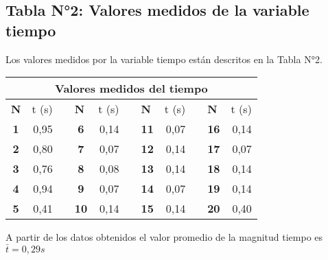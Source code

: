 \documentclass[runningheads]{llncs}
\begin{document}
    \subsection*{Tabla N°2: Valores medidos de la variable tiempo}
    Los valores medidos por la variable tiempo están descritos en la Tabla N°2.\\
    \begin{table}[]
        \centering
        \begin{tabular}{crlcrlcrlcr}
            \hline
            \multicolumn{11}{c}{\textbf{Valores medidos del tiempo}} \\ \hline
            \multicolumn{1}{l}{\textbf{N}} & \multicolumn{1}{l}{t (s)} &  & \multicolumn{1}{l}{\textbf{N}} & \multicolumn{1}{l}{t (s)} &  & \multicolumn{1}{l}{\textbf{N}} & \multicolumn{1}{l}{t (s)} &  & \multicolumn{1}{l}{\textbf{N}} & \multicolumn{1}{l}{t (s)} \\ \hline
            \textbf{1} & 0,95 &  & \textbf{6} & 0,14 &  & \textbf{11} & 0,07 &  & \textbf{16} & 0,14 \\
            \textbf{2} & 0,80 &  & \textbf{7} & 0,07 &  & \textbf{12} & 0,14 &  & \textbf{17} & 0,07 \\
            \textbf{3} & 0,76 &  & \textbf{8} & 0,08 &  & \textbf{13} & 0,14 &  & \textbf{18} & 0,14 \\
            \textbf{4} & 0,94 &  & \textbf{9} & 0,07 &  & \textbf{14} & 0,07 &  & \textbf{19} & 0,14 \\
            \textbf{5} & 0,41 &  & \textbf{10} & 0,14 &  & \textbf{15} & 0,14 &  & \textbf{20} & 0,40 \\ \hline
        \end{tabular}
    \end{table}
    A partir de los datos obtenidos el valor promedio de la magnitud tiempo es $\bar{t}=0,29s$
\end{document}
